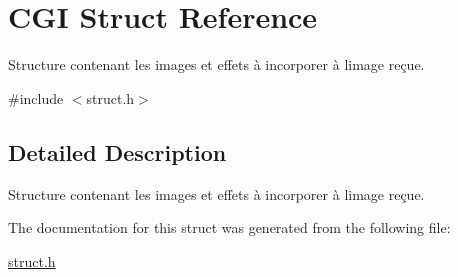 \hypertarget{struct_c_g_i}{}\section{C\+GI Struct Reference}
\label{struct_c_g_i}


Structure contenant les images et effets à incorporer à l\textquotesingle{}image reçue.  




{\ttfamily \#include $<$struct.\+h$>$}



\subsection{Detailed Description}
Structure contenant les images et effets à incorporer à l\textquotesingle{}image reçue. 

The documentation for this struct was generated from the following file\+:\begin{DoxyCompactItemize}
\item 
\hyperlink{struct_8h}{struct.\+h}\end{DoxyCompactItemize}
